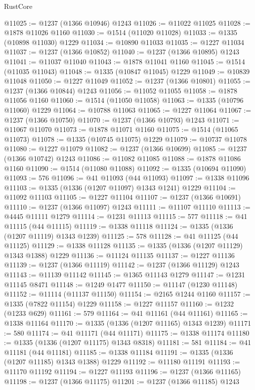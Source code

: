 \begin{lexlean}{RustCore}
\begin{coremodule}
@11025 := @1237 (@1366 @10946) @1243
@11026 := @11022 @11025
@11028 := @1878 @11026 @1160
@11030 := @1514 (@11020 @11028)
@11033 := @1335 (@10898 @11030) @1229
@11034 := @10890 @11033
@11035 := @1227 @11034
@11037 := @1237 (@1366 @10852)
@11040 := @1237 (@1366 @10895) @1243
@11041 := @11037 @11040
@11043 := @1878 @11041 @1160
@11045 := @1514 (@11035 @11043)
@11048 := @1335 (@10847 @11045) @1229
@11049 := @10839 @11048
@11050 := @1227 @11049
@11052 := @1237 (@1366 @10801)
@11055 := @1237 (@1366 @10844) @1243
@11056 := @11052 @11055
@11058 := @1878 @11056 @1160
@11060 := @1514 (@11050 @11058)
@11063 := @1335 (@10796 @11060) @1229
@11064 := @10788 @11063
@11065 := @1227 @11064
@11067 := @1237 (@1366 @10750)
@11070 := @1237 (@1366 @10793) @1243
@11071 := @11067 @11070
@11073 := @1878 @11071 @1160
@11075 := @1514 (@11065 @11073)
@11078 := @1335 (@10745 @11075) @1229
@11079 := @10737 @11078
@11080 := @1227 @11079
@11082 := @1237 (@1366 @10699)
@11085 := @1237 (@1366 @10742) @1243
@11086 := @11082 @11085
@11088 := @1878 @11086 @1160
@11090 := @1514 (@11080 @11088)
@11092 := @1335 (@10694 @11090)
@11093 := 576
@11096 := @41 @11093 (@44 @11093)
@11097 := @1338 @11096
@11103 := @1335 (@1336 (@1207 @11097) @1343 @1241) @1229
@11104 := @11092 @11103
@11105 := @1227 @11104
@11107 := @1237 (@1366 @10691)
@11110 := @1237 (@1366 @11097) @1243
@11111 := @11107 @11110
@11113 := @4445 @11111 @1279
@11114 := @1231 @11113
@11115 := 577
@11118 := @41 @11115 (@44 @11115)
@11119 := @1338 @11118
@11124 := @1335 (@1336 (@1207 @11119) @1343 @1239)
@11125 := 578
@11128 := @41 @11125 (@44 @11125)
@11129 := @1338 @11128
@11135 := @1335 (@1336 (@1207 @11129) @1343 @1388) @1229
@11136 := @11124 @11135
@11137 := @1227 @11136
@11139 := @1237 (@1366 @11119)
@11142 := @1237 (@1366 @11129) @1243
@11143 := @11139 @11142
@11145 := @1365 @11143 @1279
@11147 := @1231 @11145 @8471
@11148 := @1249 @1477
@11150 := @11147 (@1230 @11148)
@11152 := @11114 (@11137 @11150)
@11154 := @2165 @1244 @1160
@11157 := @1335 (@7822 @11154) @1229
@11158 := @1227 @11157
@11160 := @1232 (@1233 @629)
@11161 := 579
@11164 := @41 @11161 (@44 @11161)
@11165 := @1338 @11164
@11170 := @1335 (@1336 (@1207 @11165) @1343 @1239)
@11171 := 580
@11174 := @41 @11171 (@44 @11171)
@11175 := @1338 @11174
@11180 := @1335 (@1336 (@1207 @11175) @1343 @8318)
@11181 := 581
@11184 := @41 @11181 (@44 @11181)
@11185 := @1338 @11184
@11191 := @1335 (@1336 (@1207 @11185) @1343 @1388) @1229
@11192 := @11180 @11191
@11193 := @11170 @11192
@11194 := @1227 @11193
@11196 := @1237 (@1366 @11165)
@11198 := @1237 (@1366 @11175)
@11201 := @1237 (@1366 @11185) @1243

\end{coremodule}
\end{lexlean}
